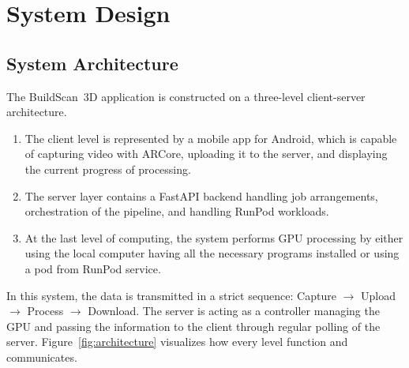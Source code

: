 \chapter{System Design}

\section{System Architecture}
The BuildScan~3D application is constructed on a three-level client-server architecture.

\begin{enumerate}
    \item The client level is represented by a mobile app for Android, which is capable of capturing video with ARCore, uploading it to the server, and displaying the current progress of processing.
    \item The server layer contains a FastAPI backend handling job arrangements, orchestration of the pipeline, and handling RunPod workloads.
    \item At the last level of computing, the system performs GPU processing by either using the local computer having all the necessary programs installed or using a pod from RunPod service.
\end{enumerate}

In this system, the data is transmitted in a strict sequence: Capture $\rightarrow$ Upload $\rightarrow$ Process $\rightarrow$ Download. The server is acting as a controller managing the GPU and passing the information to the client through regular polling of the server. Figure~\ref{fig:architecture} visualizes how every level function and communicates.

